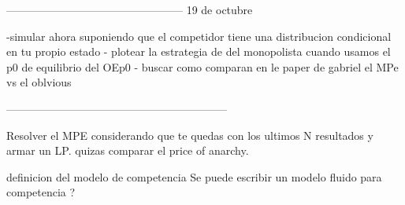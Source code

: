 ------------------------------------------------
19 de octubre

-simular ahora suponiendo que el competidor tiene una distribucion condicional en tu propio estado
- plotear la estrategia de del monopolista cuando usamos el p0 de equilibrio del OEp0 
- buscar como comparan en le paper de gabriel el MPe vs el oblvious 


------------------------------------------------------------

Resolver el MPE considerando que te quedas con los ultimos N resultados y armar un LP. 
quizas comparar el price of anarchy. 

definicion del modelo de competencia
Se puede escribir un modelo fluido para competencia ? 

